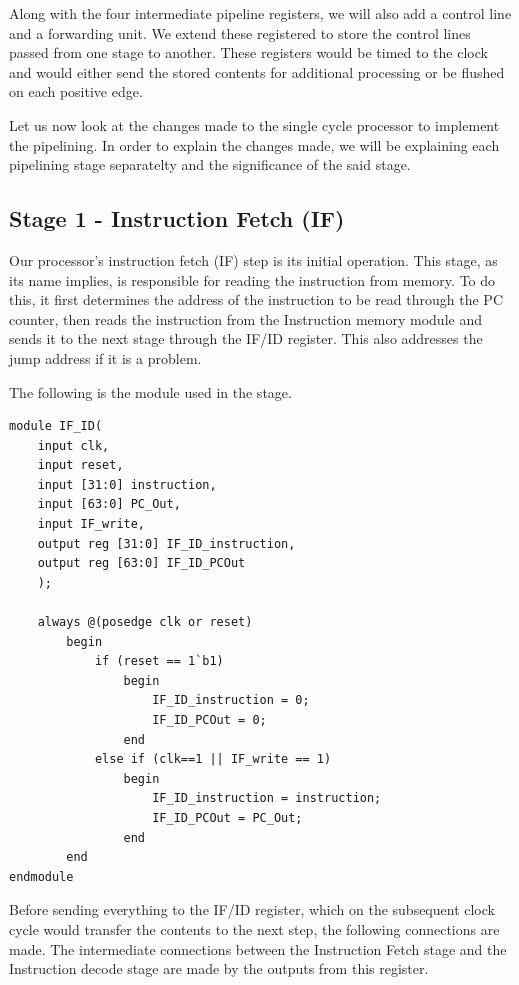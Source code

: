 \documentclass{article}
\begin{document}
Along with the four intermediate pipeline registers, we will also add a control line and a forwarding unit. We extend these registered to store the control lines passed from one stage to another. These registers would be timed to the clock and would either send the stored contents for additional processing or be flushed on each positive edge.

Let us now look at the changes made to the single cycle processor to implement the pipelining. In order to explain the changes made, we will be explaining each pipelining stage separatelty and the significance of the said stage. 

\subsection{Stage 1 - Instruction Fetch (IF)}

Our processor's instruction fetch (IF) step is its initial operation. This stage, as its name implies, is responsible for reading the instruction from memory. To do this, it first determines the address of the instruction to be read through the PC counter, then reads the instruction from the Instruction memory module and sends it to the next stage through the IF/ID register. This also addresses the jump address if it is a problem.

The following is the module used in the stage. 

\begin{lstlisting}[caption={IF/ID Register}, captionpos=b, language=RISC-V]
module IF_ID(
    input clk,
    input reset,
    input [31:0] instruction,
    input [63:0] PC_Out,
    input IF_write,
    output reg [31:0] IF_ID_instruction,
    output reg [63:0] IF_ID_PCOut
    );
    
    always @(posedge clk or reset)
        begin
            if (reset == 1`b1)
                begin
                    IF_ID_instruction = 0;
                    IF_ID_PCOut = 0;
                end
            else if (clk==1 || IF_write == 1)
                begin
                    IF_ID_instruction = instruction;
                    IF_ID_PCOut = PC_Out;
                end
        end   
endmodule
\end{lstlisting}

Before sending everything to the IF/ID register, which on the subsequent clock cycle would transfer the contents to the next step, the following connections are made. The intermediate connections between the Instruction Fetch stage and the Instruction decode stage are made by the outputs from this register.
\end{document}
